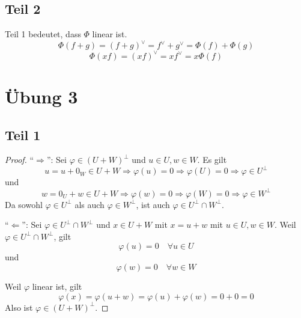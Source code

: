\documentclass[a4paper,10pt]{article}
\begin{document}
\subsection*{Teil 2}

Teil 1 bedeutet, dass $\Phi$ linear ist.
\begin{equation}
 \Phi(f + g) = (f + g)^\vee = f^\vee + g^\vee = \Phi(f) + \Phi(g)
\end{equation}
\begin{equation}
 \Phi(xf) = (xf)^\vee = xf^\vee = x\Phi(f)
\end{equation}

\section*{Übung 3}

\subsection*{Teil 1}

\begin{proof}
 ``$\Rightarrow$'': Sei $\varphi \in (U + W)^\perp$ und $u \in U, w \in W$.
 Es gilt
 \begin{equation}
  u = u + 0_W \in U + W \Rightarrow \varphi(u) = 0 \Rightarrow \varphi(U) = 0 \Rightarrow \varphi \in U^\perp
 \end{equation}
 und 
 \begin{equation}
  w = 0_U + w \in U + W \Rightarrow \varphi(w) = 0 \Rightarrow \varphi(W) = 0 \Rightarrow \varphi \in W^\perp
 \end{equation}
 Da sowohl $\varphi \in U^\perp$ als auch $\varphi \in W^\perp$, ist auch $\varphi \in U^\perp \cap W^\perp$.

 ``$\Leftarrow$'': Sei $\varphi \in U^\perp \cap W^\perp$ und $x \in U + W$ mit $x = u + w$ mit $u \in U, w \in W$.
 Weil $\varphi \in U^\perp \cap W^\perp$, gilt
 \begin{equation}
  \varphi(u) = 0 \quad \forall u \in U
 \end{equation}
 und
 \begin{equation}
  \varphi(w) = 0 \quad \forall w \in W
 \end{equation}

 Weil $\varphi$ linear ist, gilt
 \begin{equation}
  \varphi(x) = \varphi(u + w) = \varphi(u) + \varphi(w) = 0 + 0 = 0
 \end{equation}
 Also ist $\varphi \in (U + W)^\perp$.
\end{proof}
\end{document}
